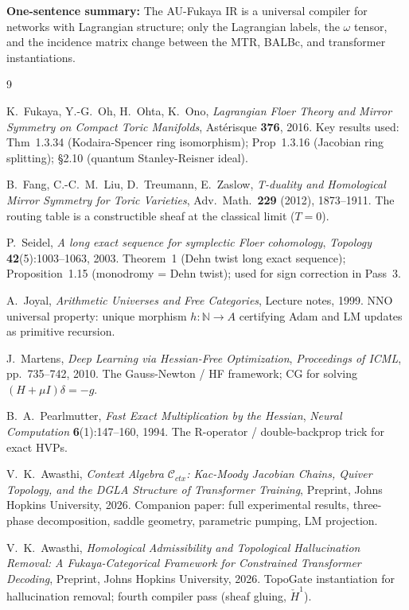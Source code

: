 \documentclass[11pt]{amsart}
\begin{document}
\textbf{One-sentence summary:} The AU-Fukaya IR is a universal
compiler for networks with Lagrangian structure; only the
Lagrangian labels, the $\omega$ tensor, and the incidence matrix
change between the MTR, BALBc, and transformer instantiations.

\begin{thebibliography}{9}

  K.~Fukaya, Y.-G.~Oh, H.~Ohta, K.~Ono,
  \emph{Lagrangian Floer Theory and Mirror Symmetry on Compact Toric Manifolds},
  Ast\'erisque \textbf{376}, 2016.
  Key results used: Thm~1.3.34 (Kodaira-Spencer ring isomorphism);
  Prop~1.3.16 (Jacobian ring splitting); \S2.10 (quantum Stanley-Reisner ideal).

  B.~Fang, C.-C.~M.~Liu, D.~Treumann, E.~Zaslow,
  \emph{T-duality and Homological Mirror Symmetry for Toric Varieties},
  Adv.\ Math.\ \textbf{229} (2012), 1873--1911.
  The routing table is a constructible sheaf at the classical limit ($T=0$).

  P.~Seidel,
  \emph{A long exact sequence for symplectic Floer cohomology},
  \emph{Topology} \textbf{42}(5):1003--1063, 2003.
  Theorem~1 (Dehn twist long exact sequence); Proposition~1.15
  (monodromy = Dehn twist); used for sign correction in Pass~3.

  A.~Joyal,
  \emph{Arithmetic Universes and Free Categories},
  Lecture notes, 1999.
  NNO universal property: unique morphism $h:\mathbb{N}\to A$
  certifying Adam and LM updates as primitive recursion.

  J.~Martens,
  \emph{Deep Learning via Hessian-Free Optimization},
  \emph{Proceedings of ICML}, pp.\ 735--742, 2010.
  The Gauss-Newton / HF framework; CG for solving $(H+\mu I)\delta = -g$.

  B.~A.~Pearlmutter,
  \emph{Fast Exact Multiplication by the Hessian},
  \emph{Neural Computation} \textbf{6}(1):147--160, 1994.
  The R-operator / double-backprop trick for exact HVPs.

  V.~K.~Awasthi,
  \emph{Context Algebra $\mathcal{C}_{ctx}$: Kac-Moody Jacobian Chains,
  Quiver Topology, and the DGLA Structure of Transformer Training},
  Preprint, Johns Hopkins University, 2026.
  Companion paper: full experimental results, three-phase decomposition,
  saddle geometry, parametric pumping, LM projection.

  V.~K.~Awasthi,
  \emph{Homological Admissibility and Topological Hallucination Removal:
  A Fukaya-Categorical Framework for Constrained Transformer Decoding},
  Preprint, Johns Hopkins University, 2026.
  TopoGate instantiation for hallucination removal;
  fourth compiler pass (sheaf gluing, $\check{H}^1$).

\end{thebibliography}
\end{document}
